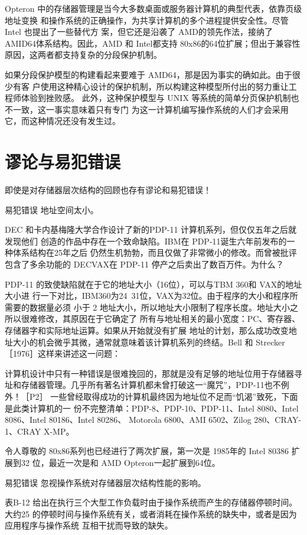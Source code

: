 Opteron 中的存储器管理是当今大多数桌面或服务器计算机的典型代表，依靠页级地址变换
和操作系统的正确操作，为共享计算机的多个进程提供安全性。尽管 Intel 也提出了一些替代方
案，但它还是沿袭了 AMD的领先作法，接纳了 AMID64体系结构。因此，AMD 和 Intel都支持
80x86的64位扩展；但出于兼容性原因，这两者都支持复杂的分段保护机制。

如果分段保护模型的构建看起来要难于 AMD64，那是因为事实的确如此。由于很少有客
户使用这种精心设计的保护机制，所以构建这种模型所付出的努力重让工程师体验到挫败感。
此外，这种保护模型与 UNIX 等系统的简单分页保护机制也不一致，这一事实意味着只有专门
为这一计算机编写操作系统的人们才会采用它，而这种情况还没有发生过。

\section{谬论与易犯错误}

即使是对存储器层次结构的回顾也存有谬论和易犯错误！

易犯错误 地址空间太小。

DEC 和卡内基梅隆大学合作设计了新的PDP-11 计算机系列，但仅仅五年之后就发现他们
创造的作品中存在一个致命缺陷。IBM在 PDP-11诞生六年前发布的一种体系结构在25年之后
仍然生机勃勃，而且仅做了非常微小的修改。而曾被批评包含了多余功能的 DECVAX在 PDP-11
停产之后卖出了数百万件。为什么？

PDP-11 的致使缺陷就在于它的地址大小（16位），可以与TBM 360和 VAX的地址大小进
行一下对比，IBM360为24~31位，VAX为32位。由于程序的大小和程序所需要的数据量必须
小于 2 地址大小，所以地址大小限制了程序长度。地址大小之所以很难修改，其原因在于它确定了
所有与地址相关的最小宽度：PC、寄存器、存储器字和实际地址运算。如果从开始就没有扩展
地址的计划，那么成功改变地址大小的机会微乎其微，通常就意味着该计算机系列的终结。Bell
和 Strecker［1976］这样来讲述这一问题：

计算机设计中只有一种错误是很难挽回的，那就是没有足够的地址位用于存储器寻
址和存储器管理。几乎所有著名计算机都未曾打破这一“魔咒”，PDP-11也不例外！［P2］
一些曾经取得成功的计算机最终因为地址位不足而“饥渴”致死，下面是此类计算机的一
份不完整清单：PDP-8、PDP-10、PDP-11、Intel 8080、Intel 8086、Intel 80186、Intel 80286、
Motorola 6800、AMI 6502、Zilog 280、CRAY-1、CRAY X-MP。

令人尊敬的 80x86系列也已经进行了两次扩展，第一次是 1985年的 Intel 80386 扩展到32
位，最近一次是和 AMD Opteron一起扩展到64位。

易犯错误 忽视操作系统对存储器层次结构性能的影响。

表B-12 给出在执行三个大型工作负载时由于操作系统而产生的存储器停顿时间。大约25%
的停顿时间与操作系统有关，或者消耗在操作系统的缺失中，或者是因为应用程序与操作系统
互相干扰而导致的缺失。

